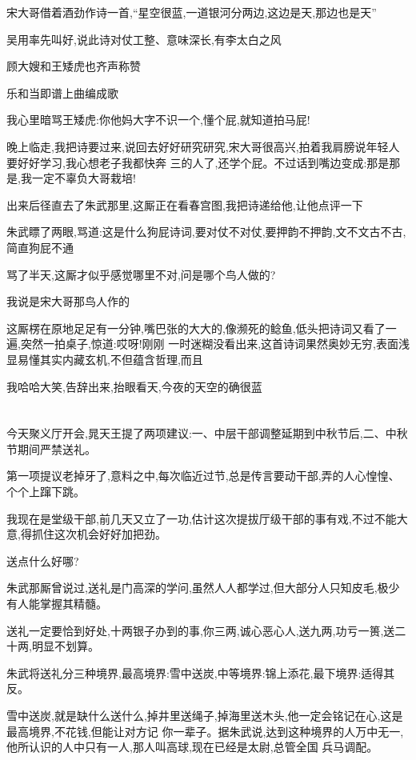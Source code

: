 ﻿\documentclass[12pt]{article}
\begin{document}
宋大哥借着酒劲作诗一首,``星空很蓝,一道银河分两边,这边是天,那边也是天\dldots ''

吴用率先叫好,说此诗对仗工整、意味深长,有李太白之风

顾大嫂和王矮虎也齐声称赞

乐和当即谱上曲编成歌

我心里暗骂王矮虎:你他妈大字不识一个,懂个屁,就知道拍马屁!

晚上临走,我把诗要过来,说回去好好研究研究,宋大哥很高兴,拍着我肩膀说年轻人要好好学习,我心想老子我都快奔
三的人了,还学个屁。不过话到嘴边变成:那是那是,我一定不辜负大哥栽培!

出来后径直去了朱武那里,这厮正在看春宫图,我把诗递给他,让他点评一下

朱武瞟了两眼,骂道:这是什么狗屁诗词,要对仗不对仗,要押韵不押韵,文不文古不古,简直狗屁不通\dldots

骂了半天,这厮才似乎感觉哪里不对,问是哪个鸟人做的?

我说是宋大哥那鸟人作的

这厮楞在原地足足有一分钟,嘴巴张的大大的,像濒死的鲶鱼,低头把诗词又看了一遍,突然一拍桌子,惊道:哎呀!刚刚
一时迷糊没看出来,这首诗词果然奥妙无穷,表面浅显易懂其实内藏玄机,不但蕴含哲理,而且\dldots

我哈哈大笑,告辞出来,抬眼看天,今夜的天空的确很蓝

\section{}

今天聚义厅开会,晁天王提了两项建议:一、中层干部调整延期到中秋节后,二、中秋节期间严禁送礼。

第一项提议老掉牙了,意料之中,每次临近过节,总是传言要动干部,弄的人心惶惶、个个上蹿下跳。

我现在是堂级干部,前几天又立了一功,估计这次提拔厅级干部的事有戏,不过不能大意,得抓住这次机会好好加把劲。

送点什么好哪?

朱武那厮曾说过,送礼是门高深的学问,虽然人人都学过,但大部分人只知皮毛,极少有人能掌握其精髓。

送礼一定要恰到好处,十两银子办到的事,你三两,诚心恶心人,送九两,功亏一篑,送二十两,明显不划算。

朱武将送礼分三种境界,最高境界:雪中送炭,中等境界:锦上添花,最下境界:适得其反。

雪中送炭,就是缺什么送什么,掉井里送绳子,掉海里送木头,他一定会铭记在心,这是最高境界,不花钱,但能让对方记
你一辈子。据朱武说,达到这种境界的人万中无一,他所认识的人中只有一人,那人叫高球,现在已经是太尉,总管全国
兵马调配。
\end{document}
